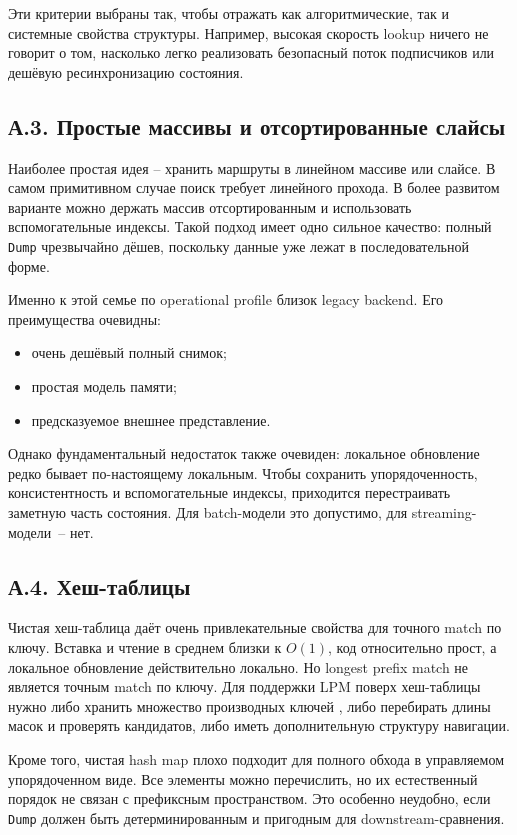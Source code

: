 Эти критерии выбраны так, чтобы отражать как алгоритмические, так и
системные свойства структуры. Например, высокая скорость lookup
ничего не говорит о том, насколько легко реализовать безопасный
поток подписчиков или дешёвую ресинхронизацию состояния.

\subsection*{А.3. Простые массивы и отсортированные слайсы}

Наиболее простая идея -- хранить маршруты в линейном массиве или
слайсе. В самом примитивном случае поиск требует линейного прохода. В
более развитом варианте можно держать массив отсортированным и
использовать вспомогательные индексы. Такой подход имеет одно
сильное качество: полный \texttt{Dump} чрезвычайно дёшев, поскольку
данные уже лежат в последовательной форме.

Именно к этой семье по operational profile близок legacy backend.
Его преимущества очевидны:

\begin{itemize}
\item очень дешёвый полный снимок;
\item простая модель памяти;
\item предсказуемое внешнее представление.
\end{itemize}

Однако фундаментальный недостаток также очевиден: локальное
обновление редко бывает по-настоящему локальным. Чтобы сохранить
упорядоченность, консистентность и вспомогательные индексы,
приходится перестраивать заметную часть состояния. Для batch-модели
это допустимо, для streaming-модели~-- нет.

\subsection*{А.4. Хеш-таблицы}

Чистая хеш-таблица даёт очень привлекательные свойства для точного
match по ключу. Вставка и чтение в среднем близки к $O(1)$, код
относительно прост, а локальное обновление действительно локально.
Но longest prefix match не является точным match по ключу. Для
поддержки LPM поверх хеш-таблицы нужно либо хранить множество
производных ключей \cite{waldvogel1997scalable}, либо перебирать
длины масок и проверять кандидатов, либо иметь дополнительную
структуру навигации.

Кроме того, чистая hash map плохо подходит для полного обхода в
управляемом упорядоченном виде. Все элементы можно перечислить, но
их естественный порядок не связан с префиксным пространством. Это
особенно неудобно, если \texttt{Dump} должен быть детерминированным
и пригодным для downstream-сравнения.

